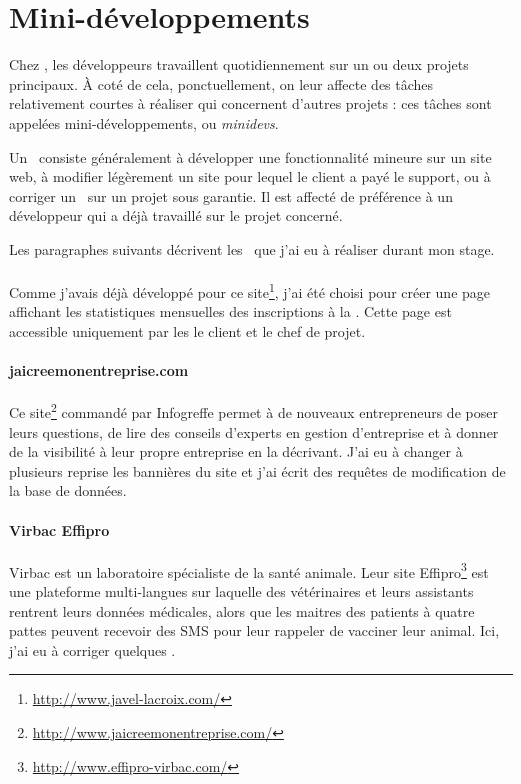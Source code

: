 \section{Mini-développements}
\label{minidev}

Chez \asl, les développeurs travaillent quotidiennement sur un ou deux projets principaux. À coté de cela, ponctuellement, on leur affecte des tâches relativement courtes à réaliser qui concernent d'autres projets : ces tâches sont appelées mini-développements, ou \emph{minidevs}.

Un \aminidev\ consiste généralement à développer une fonctionnalité mineure sur un site web, à modifier légèrement un site pour lequel le client a payé le support, ou à corriger un \abug\ sur un projet sous garantie. Il est affecté de préférence à un développeur qui a déjà travaillé sur le projet concerné. 

Les paragraphes suivants décrivent les \aminidevs\ que j'ai eu à réaliser durant mon stage.

\paragraph{\alc} Comme j'avais déjà développé pour ce site\footnote{\url{http://www.javel-lacroix.com/}}, j'ai été choisi pour créer une page affichant les statistiques mensuelles des inscriptions à la \anewsletter. Cette page est accessible uniquement par les le client et le chef de projet.

\paragraph{jaicreemonentreprise.com} Ce site\footnote{\url{http://www.jaicreemonentreprise.com/}} commandé par Infogreffe permet à de nouveaux entrepreneurs de poser leurs questions, de lire des conseils d'experts en gestion d'entreprise et à donner de la visibilité à leur propre entreprise en la décrivant. J'ai eu à changer à plusieurs reprise les bannières du site et j'ai écrit des requêtes de modification de la base de données.

\paragraph{Virbac Effipro} Virbac est un laboratoire spécialiste de la santé animale. Leur site Effipro\footnote{\url{http://www.effipro-virbac.com/}} est une plateforme multi-langues sur laquelle des vétérinaires et leurs assistants rentrent leurs données médicales, alors que les maitres des patients à quatre pattes peuvent recevoir des SMS pour leur rappeler de vacciner leur animal. Ici, j'ai eu à corriger quelques \abugs.

